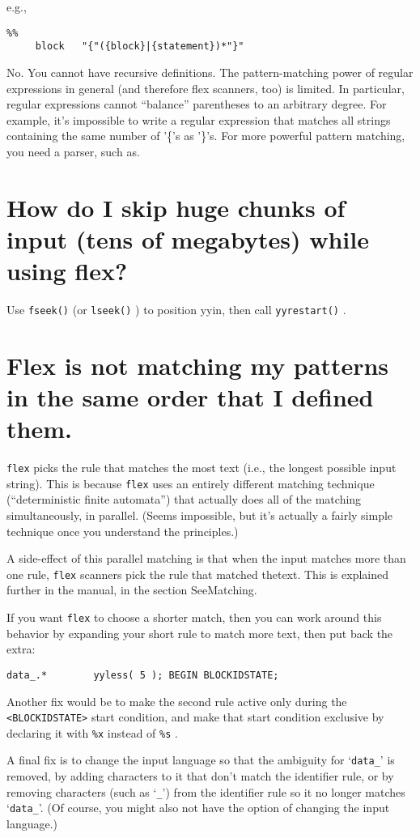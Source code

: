 \documentclass[openany,oneside]{book}
\begin{document}
e.g.,
\begin{verbatim}
%%
     block   "{"({block}|{statement})*"}"
\end{verbatim}


No. You cannot have recursive definitions.  The pattern-matching power of
regular expressions in general (and therefore flex scanners, too) is
limited.  In particular, regular expressions cannot “balance” parentheses
to an arbitrary degree.  For example, it's impossible to write a regular
expression that matches all strings containing the same number of '\{{}'s
as '\}{}'s.  For more powerful pattern matching, you need a parser, such
as.
\section{How do I skip huge chunks of input (tens of megabytes) while using flex?}


Use \verb`fseek()` (or \verb`lseek()` ) to position yyin, then call \verb`yyrestart()` .
\section{Flex is not matching my patterns in the same order that I defined them.}


 \verb`flex` picks the
rule that matches the most text (i.e., the longest possible input string). 
This is because \verb`flex` uses an entirely different matching technique
(“deterministic finite automata”) that actually does all of the matching
simultaneously, in parallel.  (Seems impossible, but it's actually a fairly
simple technique once you understand the principles.)

A side-effect of this parallel matching is that when the input matches more
than one rule, \verb`flex` scanners pick the rule that matched thetext. This
is explained further in the manual, in the section SeeMatching.

If you want \verb`flex` to choose a shorter match, then you can work around this
behavior by expanding your short
rule to match more text, then put back the extra:
\begin{verbatim}
data_.*        yyless( 5 ); BEGIN BLOCKIDSTATE;
\end{verbatim}


Another fix would be to make the second rule active only during the \verb`<BLOCKIDSTATE>` start condition, and make that start condition exclusive
by declaring it with \verb`%x` instead of \verb`%s` .

A final fix is to change the input language so that the ambiguity for
‘\verb`data_`’ is removed, by adding characters to it that don't match the
identifier rule, or by removing characters (such as ‘\verb`_`’) from the
identifier rule so it no longer matches ‘\verb`data_`’.  (Of course, you might
also not have the option of changing the input language.)
\end{document}
